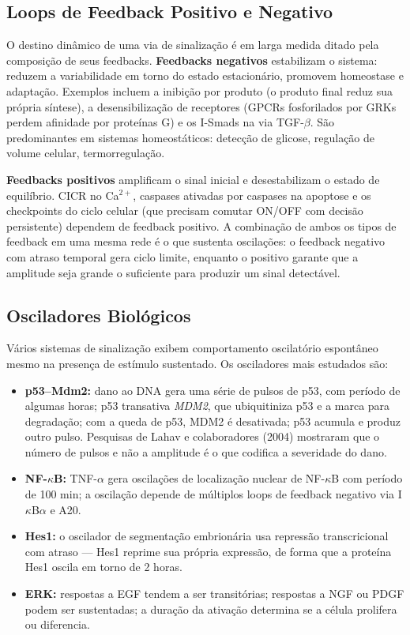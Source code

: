 \subsection{Loops de Feedback Positivo e Negativo}
\label{sub:image9-feedback}

O destino dinâmico de uma via de sinalização é em larga medida ditado pela
composição de seus feedbacks. \textbf{Feedbacks negativos} estabilizam o
sistema: reduzem a variabilidade em torno do estado estacionário, promovem
homeostase e adaptação. Exemplos incluem a inibição por produto (o produto
final reduz sua própria síntese), a desensibilização de receptores (GPCRs
fosforilados por GRKs perdem afinidade por proteínas G) e os I-Smads na
via TGF-$\beta$. São predominantes em sistemas homeostáticos: detecção de
glicose, regulação de volume celular, termorregulação.

\textbf{Feedbacks positivos} amplificam o sinal inicial e desestabilizam o
estado de equilíbrio. CICR no Ca$^{2+}$, caspases ativadas por caspases na
apoptose e os checkpoints do ciclo celular (que precisam comutar ON/OFF com
decisão persistente) dependem de feedback positivo. A combinação de ambos os
tipos de feedback em uma mesma rede é o que sustenta oscilações: o feedback
negativo com atraso temporal gera ciclo limite, enquanto o positivo garante
que a amplitude seja grande o suficiente para produzir um sinal detectável.

\subsection{Osciladores Biológicos}
\label{subfigure:09-oscilacoes}

Vários sistemas de sinalização exibem comportamento oscilatório espontâneo
mesmo na presença de estímulo sustentado. Os osciladores mais estudados são:

\begin{itemize}
\item \textbf{p53--Mdm2:} dano ao DNA gera uma série de pulsos de p53, com período
de algumas horas; p53 transativa \emph{MDM2}, que ubiquitiniza p53 e a marca
para degradação; com a queda de p53, MDM2 é desativada; p53 acumula e produz
outro pulso. Pesquisas de Lahav e colaboradores (2004) mostraram que o número
de pulsos e não a amplitude é o que codifica a severidade do dano.
\item \textbf{NF-$\kappa$B:} TNF-$\alpha$ gera oscilações de localização nuclear
de NF-$\kappa$B com período de 100 min; a oscilação depende de múltiplos
loops de feedback negativo via I$\kappa$B$\alpha$ e A20.
\item \textbf{Hes1:} o oscilador de segmentação embrionária usa repressão
transcricional com atraso --- Hes1 reprime sua própria expressão, de forma
que a proteína Hes1 oscila em torno de 2 horas.
\item \textbf{ERK:} respostas a EGF tendem a ser transitórias; respostas a
NGF ou PDGF podem ser sustentadas; a duração da ativação determina se a
célula prolifera ou diferencia.
\end{itemize}

